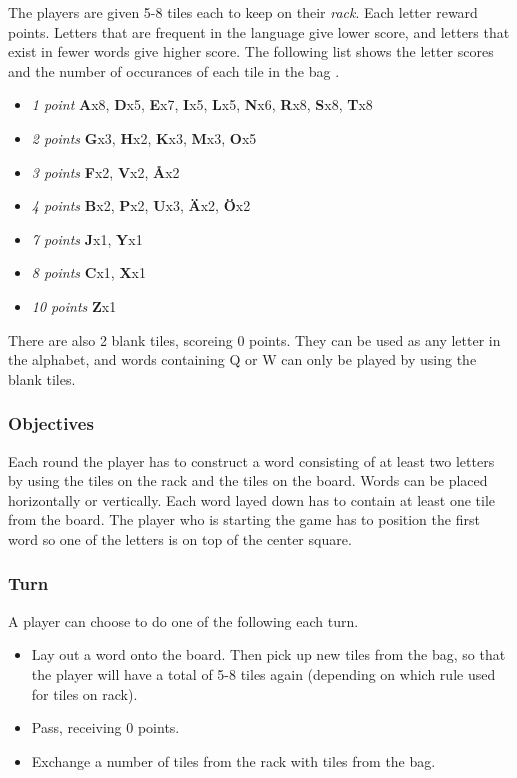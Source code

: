 \documentclass[a4paper, 12pt]{report}
\begin{document}
The players are given 5-8 tiles each to keep on their \emph{rack}. Each letter reward points. Letters that are frequent in the language give lower score, and letters that exist in fewer words give higher score. The following list shows the letter scores and the number of occurances of each tile in the bag \cite{letterpoints}.

\begin{itemize}
\label{letter+table}
	\item{\emph{1 point}} \textbf{A}x8, \textbf{D}x5, \textbf{E}x7, \textbf{I}x5, \textbf{L}x5, \textbf{N}x6, \textbf{R}x8, \textbf{S}x8, \textbf{T}x8
	\item{\emph{2 points}} \textbf{G}x3, \textbf{H}x2, \textbf{K}x3, \textbf{M}x3, \textbf{O}x5
	\item{\emph{3 points}} \textbf{F}x2, \textbf{V}x2, \textbf{Å}x2
	\item{\emph{4 points}} \textbf{B}x2, \textbf{P}x2, \textbf{U}x3, \textbf{Ä}x2, \textbf{Ö}x2
	\item{\emph{7 points}} \textbf{J}x1, \textbf{Y}x1
	\item{\emph{8 points}} \textbf{C}x1, \textbf{X}x1
	\item{\emph{10 points}} \textbf{Z}x1
\end{itemize}

There are also 2 blank tiles, scoreing 0 points. They can be used as any letter in the alphabet, and words containing Q or W can only be played by using the blank tiles.

\subsubsection{Objectives}
Each round the player has to construct a word consisting of at least two letters by using the tiles on the rack and the tiles on the board. Words can be placed horizontally or vertically. Each word layed down has to contain at least one tile from the board. The player who is starting the game has to position the first word so one of the letters is on top of the center square.

\subsubsection{Turn}
A player can choose to do one of the following each turn.
\begin{itemize}
\item Lay out a word onto the board. Then pick up new tiles from the bag, so that the player will have a total of 5-8 tiles again (depending on which rule used for tiles on rack).
\item Pass, receiving 0 points.
\item Exchange a number of tiles from the rack with tiles from the bag.
\end{itemize}
\end{document}
